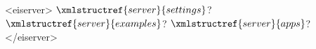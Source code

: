 <eiserver>
  $\xmlstructref{server}{settings}$?
  $\xmlstructref{server}{examples}$?
  $\xmlstructref{server}{apps}$?
</eiserver>
